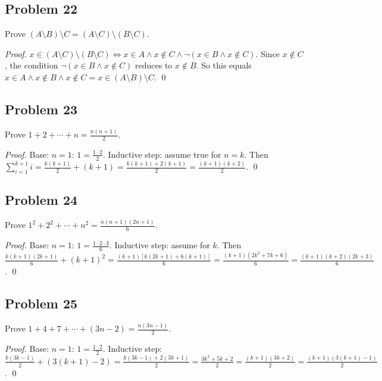 \subsection*{Problem 22}
Prove $(A \setminus B) \setminus C = (A \setminus C) \setminus (B \setminus C)$.

\textit{Proof.}
$x \in (A \setminus C) \setminus (B \setminus C) \iff x \in A \land x \notin C \land \lnot(x \in B \land x \notin C)$.
Since $x \notin C$, the condition $\lnot(x \in B \land x \notin C)$ reduces to $x \notin B$.
So this equals $x \in A \land x \notin B \land x \notin C = x \in (A \setminus B) \setminus C$. \qed

\subsection*{Problem 23}
Prove $1 + 2 + \cdots + n = \frac{n(n+1)}{2}$.

\textit{Proof.} Base: $n=1$: $1 = \frac{1 \cdot 2}{2}$. Inductive step: assume true for $n=k$. Then
$\sum_{i=1}^{k+1} i = \frac{k(k+1)}{2} + (k+1) = \frac{k(k+1)+2(k+1)}{2} = \frac{(k+1)(k+2)}{2}$. \qed

\subsection*{Problem 24}
Prove $1^2 + 2^2 + \cdots + n^2 = \frac{n(n+1)(2n+1)}{6}$.

\textit{Proof.} Base: $n=1$: $1 = \frac{1 \cdot 2 \cdot 3}{6}$. Inductive step: assume for $k$. Then
$\frac{k(k+1)(2k+1)}{6} + (k+1)^2 = \frac{(k+1)[k(2k+1)+6(k+1)]}{6} = \frac{(k+1)(2k^2+7k+6)}{6} = \frac{(k+1)(k+2)(2k+3)}{6}$. \qed

\subsection*{Problem 25}
Prove $1 + 4 + 7 + \cdots + (3n-2) = \frac{n(3n-1)}{2}$.

\textit{Proof.} Base: $n=1$: $1 = \frac{1 \cdot 2}{2}$. Inductive step:
$\frac{k(3k-1)}{2} + (3(k+1)-2) = \frac{k(3k-1) + 2(3k+1)}{2} = \frac{3k^2+5k+2}{2} = \frac{(k+1)(3k+2)}{2} = \frac{(k+1)(3(k+1)-1)}{2}$. \qed

